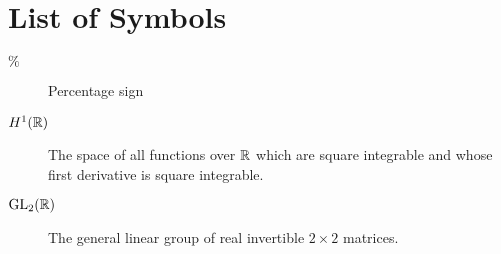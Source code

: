 \chapter*{List of Symbols}
\begin{description}
\item[$\%$]{Percentage sign}
\item[$H^1({\mathbb R})$] The space of all functions over ${\mathbb R}$ which are square integrable and whose first derivative is square integrable.
\item[$\mathrm{GL}_2({\mathbb R})$] The general linear group of real invertible $2\times2$ matrices.
\end{description}
\pagebreak